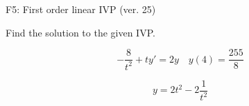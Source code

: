 \begin{exercise}
  \begin{exerciseTitle}F5: First order linear IVP (ver. 25)\end{exerciseTitle}
  \begin{exerciseStatement}
    
Find the solution to the given IVP.

    
\[-\frac{8}{t^{2}} +ty'= 2 y \hspace{1em} y( 4 ) = \frac{255}{8}\]

  \end{exerciseStatement}
  \begin{exerciseAnswer}
    
\[y= 2 t^ 2 -2 \frac{1}{t^{2}}\]

  \end{exerciseAnswer}
\end{exercise}